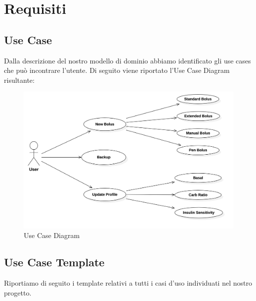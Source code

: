 \documentclass[twocolumn]{article}
\begin{document}
\newpage
\section{Requisiti}

\subsection{Use Case}
Dalla descrizione del nostro modello di dominio abbiamo identificato gli use cases che può incontrare l'utente. Di seguito viene riportato l’Use Case Diagram risultante:

\null\vfill
\begin{figure}[!htbp]
    \centering
    \includegraphics[width=14cm]{UseCaseDiagram.jpg}
    \caption{Use Case Diagram}
    \label{fig:use-case}
\end{figure}
\vfill\null

\newpage
\subsection{Use Case Template}

Riportiamo di seguito i template relativi a tutti i casi d’uso individuati nel nostro progetto.
\end{document}
